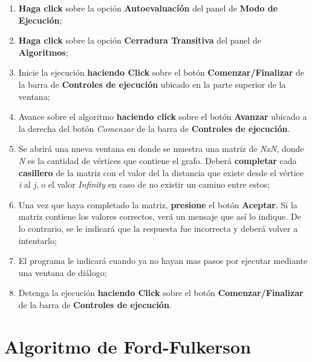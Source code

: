 \documentclass{book}
\begin{document}
\begin{enumerate}
	\itemsep=8pt \topsep=0pt \partopsep=0pt \parskip=0pt \parsep=0pt

	\item \textbf{Haga click} sobre la opción \textbf{Autoevaluacíón} del panel de \textbf{Modo de Ejecución};

	\item \textbf{Haga click} sobre la opción \textbf{Cerradura Transitiva} del panel de \textbf{Algoritmos};

	\item Inicie la ejecución \textbf{haciendo Click} sobre el botón \textbf{Comenzar/Finalizar} de la barra de \textbf{Controles de ejecución} ubicado en la parte superior de la ventana;

	\item Avance sobre el algoritmo \textbf{haciendo click} sobre el botón \textbf{Avanzar} ubicado a la derecha del botón \textit{Comenzar} de la barra de \textbf{Controles de ejecución}.

	\item Se abrirá una nueva ventana en donde se muestra una matriz de \textit{NxN}, donde \textit{N} es la cantidad de vértices que contiene el grafo. Deberá \textbf{completar} cada \textbf{casillero} de la matriz con el valor del la distancia que existe desde el vértice \textit{i} al \textit{j}, o el valor \textit{Infinity} en caso de no existir un camino entre estos;

	\item Una vez que haya completado la matriz, \textbf{presione} el botón \textbf{Aceptar}. Si la matriz contiene los valores correctos, verá un mensaje que así lo indique. De lo contrario, se le indicará que la respuesta fue incorrecta y deberá volver a intentarlo;

	\item El programa le indicará cuando ya no hayan mas pasos por ejecutar mediante una ventana de diálogo;

	\item Detenga la ejecución \textbf{haciendo Click} sobre el botón \textbf{Comenzar/Finalizar} de la barra de \textbf{Controles de ejecución}.

\end{enumerate}
\medskip




%
%
\chapter{Algoritmo de Ford-Fulkerson}
\end{document}
